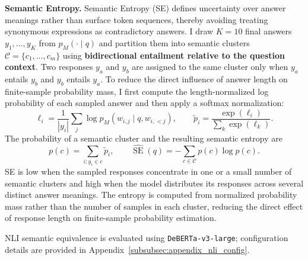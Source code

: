 \textbf{Semantic Entropy.} Semantic Entropy (SE) defines uncertainty over answer meanings rather than surface token sequences, thereby avoiding treating synonymous expressions as contradictory answers. I draw $K=10$ final answers $y_1,\ldots,y_K$ from $p_M(\cdot\mid q)$ and partition them into semantic clusters $\mathcal C=\{c_1,\ldots,c_m\}$ using \textbf{bidirectional entailment relative to the question context}. Two responses $y_a$ and $y_b$ are assigned to the same cluster only when $y_a$ entails $y_b$ and $y_b$ entails $y_a$. To reduce the direct influence of answer length on finite-sample probability mass, I first compute the length-normalized log probability of each sampled answer and then apply a softmax normalization:
\[
\ell_i=\frac{1}{|y_i|}\sum_j\log p_M(w_{i,j}\mid q,w_{i,<j}),
\qquad
\tilde p_i=\frac{\exp(\ell_i)}{\sum_k\exp(\ell_k)}.
\]
The probability of a semantic cluster and the resulting semantic entropy are
\[
p(c)=\sum_{i:y_i\in c}\tilde p_i,
\qquad
\widehat{\operatorname{SE}}(q)=-\sum_{c\in\mathcal C}p(c)\log p(c).
\]
SE is low when the sampled responses concentrate in one or a small number of semantic clusters and high when the model distributes its responses across several distinct answer meanings. The entropy is computed from normalized probability mass rather than the number of samples in each cluster, reducing the direct effect of response length on finite-sample probability estimation.

NLI semantic equivalence is evaluated using \texttt{DeBERTa-v3-large}; configuration details are provided in Appendix~\ref{subsubsec:appendix_nli_config}.

